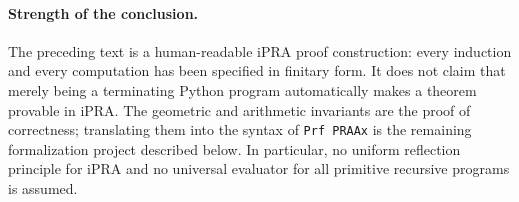 \paragraph{Strength of the conclusion.}
The preceding text is a human-readable iPRA proof construction: every
induction and every computation has been specified in finitary form.
It does not claim that merely being a terminating Python program
automatically makes a theorem provable in iPRA. The geometric and
arithmetic invariants are the proof of correctness; translating them
into the syntax of \texttt{Prf PRAAx} is the remaining formalization
project described below. In particular, no uniform reflection
principle for iPRA and no universal evaluator for all primitive
recursive programs is assumed.
